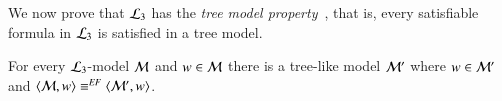 %

We now prove that $\mathcal{L}_3$ has the \emph{tree model property}~\cite{BRV01},
that is, every satisfiable formula in $\mathcal{L}_3$ is satisfied in a tree model.

\begin{thm}\label{prop:tree-model-property}
For every $\mathcal{L}_3$-model
$\mathcal{M}$ and $w\in\mathcal{M}$ there is a tree-like model $\mathcal{M}'$ where
$w\in\mathcal{M}'$ and $\langle \mathcal{M},w \rangle\equiv^{\mathit{EF}}\langle \mathcal{M}',w \rangle$.
\end{thm}

